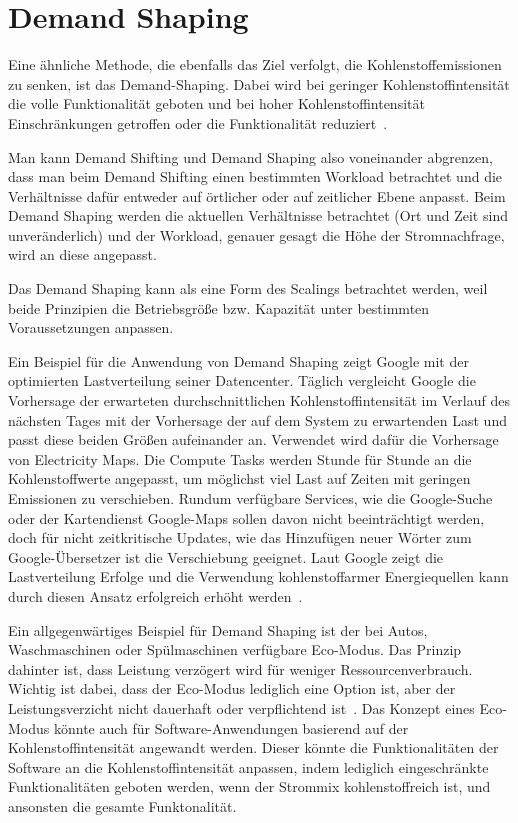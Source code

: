 \section{Demand Shaping}
Eine ähnliche Methode, die ebenfalls das Ziel verfolgt, die Kohlenstoffemissionen zu senken, ist das Demand-Shaping.
Dabei wird bei geringer Kohlenstoffintensität die volle Funktionalität geboten und bei hoher Kohlenstoffintensität Einschränkungen getroffen oder die Funktionalität reduziert~\cite{Currie.2024}.

Man kann Demand Shifting und Demand Shaping also voneinander abgrenzen, dass man beim Demand Shifting einen bestimmten Workload betrachtet und die Verhältnisse dafür entweder auf örtlicher oder auf zeitlicher Ebene anpasst.
Beim Demand Shaping werden die aktuellen Verhältnisse betrachtet (Ort und Zeit sind unveränderlich) und der Workload, genauer gesagt die Höhe der Stromnachfrage, wird an diese angepasst.

Das Demand Shaping kann als eine Form des Scalings betrachtet werden, weil beide Prinzipien die Betriebsgröße bzw. Kapazität unter bestimmten Voraussetzungen anpassen.

Ein Beispiel für die Anwendung von Demand Shaping zeigt Google mit der optimierten Lastverteilung seiner Datencenter.
Täglich vergleicht Google die Vorhersage der erwarteten durchschnittlichen Kohlenstoffintensität im Verlauf des nächsten Tages mit der Vorhersage der auf dem System zu erwartenden Last und passt diese beiden Größen aufeinander an.
Verwendet wird dafür die Vorhersage von Electricity Maps.
Die Compute Tasks werden Stunde für Stunde an die Kohlenstoffwerte angepasst, um möglichst viel Last auf Zeiten mit geringen Emissionen zu verschieben.
Rundum verfügbare Services, wie die Google-Suche oder der Kartendienst Google-Maps sollen davon nicht beeinträchtigt werden, doch für nicht zeitkritische Updates, wie das Hinzufügen neuer Wörter zum Google-Übersetzer ist die Verschiebung geeignet.
Laut Google zeigt die Lastverteilung Erfolge und die Verwendung kohlenstoffarmer Energiequellen kann durch diesen Ansatz erfolgreich erhöht werden~\cite{Radovanovic.22.4.2020}.

Ein allgegenwärtiges Beispiel für Demand Shaping ist der bei Autos, Waschmaschinen oder Spülmaschinen verfügbare Eco-Modus.
Das Prinzip dahinter ist, dass Leistung verzögert wird für weniger Ressourcenverbrauch.
Wichtig ist dabei, dass der Eco-Modus lediglich eine Option ist, aber der Leistungsverzicht nicht dauerhaft oder verpflichtend ist~\cite{GreenSoftwareFoundation.2022}.
Das Konzept eines Eco-Modus könnte auch für Software-Anwendungen basierend auf der Kohlenstoffintensität angewandt werden.
Dieser könnte die Funktionalitäten der Software an die Kohlenstoffintensität anpassen, indem lediglich eingeschränkte Funktionalitäten geboten werden, wenn der Strommix \glqq kohlenstoffreich\grqq{} ist, und ansonsten die gesamte Funktonalität.

